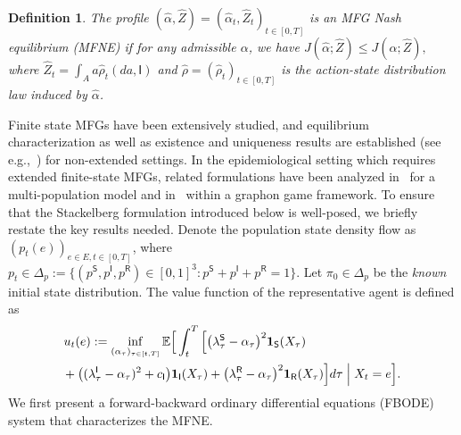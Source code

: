\documentclass[letterpaper, 10 pt, conference]{ieeeconf}  %
\def\sS{\mathsf{S}}
\def\sI{\mathsf{I}}
\def\sR{\mathsf{R}}
\newtheorem{definition}[theorem]{Definition}
\begin{document}
\begin{definition}
    The profile $(\hat{\alpha}, \hat{Z}) = (\hat{\alpha}_t, \hat{Z}_t)_{t \in [0,T]}$ is an MFG Nash equilibrium (MFNE) if for any admissible $\alpha$, we have
    $J(\hat{\alpha};\hat{Z}) \leq J(\alpha;\hat{Z}),$
    where $\hat{Z}_t = \int_A a \hat{\rho}_t(d a, \sI)$ and $\hat{\rho} = (\hat{\rho}_t)_{t \in [0,T]}$ is the action-state distribution law induced by $\hat{\alpha}$.
\end{definition}

Finite state MFGs have been extensively studied, and equilibrium characterization as well as existence and uniqueness results are established (see e.g.,~\cite{Gomes2013,carmonawang_prob_approach_extended}) for non-extended settings. In the epidemiological setting which requires extended finite-state MFGs, related formulations have been analyzed in~\cite{liu2025incorporatingauthorityperceptioneconomic} for a multi-population model and in~\cite{aurell2022finite} within a graphon game framework. To ensure that the Stackelberg formulation introduced below is well-posed, we briefly restate the key results needed. Denote the population state density flow as $(p_t(e))_{e \in E, t \in [0,T]}$, where $p_t \in \Delta_p := \{(p^\sS, p^\sI, p^\sR) \in[0,1]^3: p^\sS+p^\sI+p^\sR=1\}$. Let $\pi_0 \in \Delta_p$ be the \textit{known} initial state distribution. The value function of the representative agent is defined as
{\small $$\begin{aligned}
u_t(e)
&:=\inf_{(\alpha_\tau)_{\tau\in[t,T]}}
\mathbb{E}\Big[
\int_t^T \Big[
\big(\lambda_\tau^{\sS}-\alpha_\tau\big)^2\mathbf{1}_{\sS}(X_\tau)\\
&\hspace{-0.8cm}+\big((\lambda_\tau^{\sI}-\alpha_\tau)^2+c_{\sI}\big)\mathbf{1}_{\sI}(X_\tau)
+\big(\lambda_\tau^{\sR}-\alpha_\tau\big)^2\mathbf{1}_{\sR}(X_\tau)
\Big]d\tau
\Bigm| X_t=e
\Big].
\end{aligned}$$}
We first present a forward-backward ordinary differential equations (FBODE) system that characterizes the MFNE.
\end{document}
